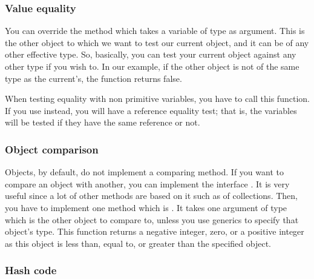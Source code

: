 \documentclass{KodeBook}
\begin{document}


\subsubsection{Value equality}

You can override the method  which takes a variable of type  as argument.
This is the other object to which we want to test our current object, and it can be of any other effective type. 
So, basically, you can test your current object against any other type if you wish to.
In our example, if the other object is not of the same type as the current's, the function returns false.



When testing equality with non primitive variables, you have to call this function. 
If you use \keyword{==} instead, you will have a reference equality test; that is, the variables will be tested if they have the same reference or not.



\subsubsection{Object comparison}

Objects, by default, do not implement a comparing method. 
If you want to compare an object with another, you can implement the interface . 
It is very useful since a lot of other methods are based on it such as  of collections.
Then, you have to implement one method which is . 
It takes one argument of type  which is the other object to compare to, unless you use generics to specify that object's type. 
This function returns a negative integer, zero, or a positive integer as this object is less than, equal to, or greater than the specified object.



\subsubsection{Hash code}
\end{document}
